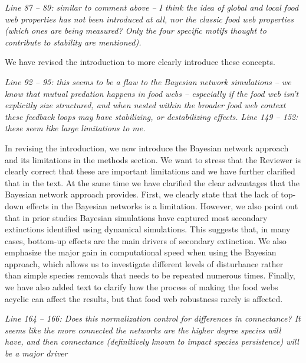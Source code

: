 \documentclass[12pt]{article}
\newcommand{\us}{\rm \setlength{\leftskip}{0.3cm} \setlength{\rightskip}{0.3cm}}
\newcommand{\them}{\it \setlength{\leftskip}{0cm} \setlength{\rightskip}{0cm}}
\begin{document}
        
        
        \them
        Line 87 – 89: similar to comment above – I think the idea of global and local food web properties has not been introduced at all, nor the classic food web properties (which ones are being measured? Only the four specific motifs thought to contribute to stability are mentioned).
        
        \us We have revised the introduction to more clearly introduce these concepts. 
        
        \them
        Line 92 – 95: this seems to be a flaw to the Bayesian network simulations – we know that mutual predation happens in food webs – especially if the food web isn’t explicitly size structured, and when nested within the broader food web context these feedback loops may have stabilizing, or destabilizing effects.
        \smallskip
        Line 149 – 152: these seem like large limitations to me.
        
        
        \us In revising the introduction, we now introduce the Bayesian network approach and its limitations in the methods section. We want to stress that the Reviewer is clearly correct that these are important limitations and we have further clarified that in the text. At the same time we have clarified the clear advantages that the Bayesian network approach provides.
        First, we clearly state that the lack of top-down effects in the Bayesian networks is a limitation. However, we also point out that in prior studies Bayesian simulations have captured most secondary extinctions identified using dynamical simulations. This suggests that, in many cases, bottom-up effects are the main drivers of secondary extinction. We also emphasize the major gain in computational speed when using the Bayesian approach, which allows us to investigate different levels of disturbance rather than simple species removals that needs to be repeated numerous times. Finally, we have also added text to clarify how the process of making the food webs acyclic can affect the results, but that food web robustness rarely is affected.  
        
        \them
        Line 164 – 166: Does this normalization control for differences in connectance? It seems like the more connected the networks are the higher degree species will have, and then connectance (definitively known to impact species persistence) will be a major driver
        
\end{document}
